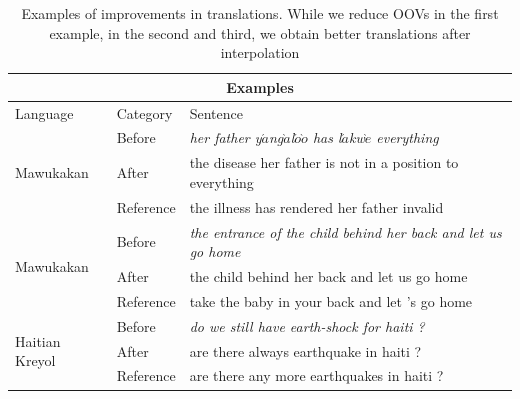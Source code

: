 \documentclass[11pt]{article}
\begin{document}
	\begin{table}
	\begin{tabular}{|l|l|l|}
		\toprule
		\multicolumn{3}{|c|}{Examples} \\
		\toprule
		Language & Category & Sentence \\
		\toprule
		\multirow{3}{*}{Mawukakan} & Before & \emph{her father y$\acute{a}$ng$\grave{a}$l$\acute{o}$$\grave{o}$ has l$\acute{a}$kw$\grave{e}$ everything} \\ & After & the disease her father is not in a position to everything \\ &  Reference & the illness has rendered her father invalid \\
		\midrule
		\multirow{3}{*}{Mawukakan} & Before & \emph{the entrance of the child behind her back and let us go home} \\ & After & the child behind her back and let us go home \\ & Reference & take the baby in your back and let 's go home \\ 
		\midrule
		\multirow{3}{*}{Haitian Kreyol} & Before & \emph{do we still have earth-shock for haiti ?} \\ & After & are there always earthquake in haiti ? \\ & Reference &  are there any more earthquakes in haiti ?\\
		\bottomrule
	\end{tabular}
	\caption{Examples of improvements in translations. While we reduce OOVs in the first example, in the second and third, we obtain better translations after interpolation}	
	\label{table:example_translations}
	\end{table}

	\begin{comment}
	\begin{table}
		\small
		\centering
		
		\caption{Examples of improvements in translations}
		\label{table:examples}
	\end{table}
	

	In the Table~\ref{table:examples}, we report examples of improvements in translations. In the first example, we observe that two words that were OOVs for our baseline model have translations after triangulation \& interpolation. In the second and third examples, we observe that triangulation leads to better translations. ``The entrance of the child'' is the only translation for the source phrase \emph{$l\acute{a}$} while after triangulation, we have several translations. In case of ``tranblemannt\`e'', our baseline model has several English translations but none of them mention ``earthquake''. They lead to shaking, tension, of the earthquake, but not the word ``earthquake''. 
	\end{comment}
\end{document}
